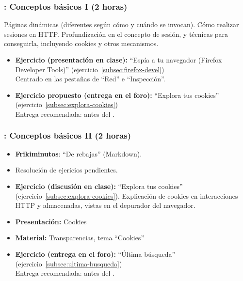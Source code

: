 \documentclass[a4paper,12pt]{article}
\begin{document}
\subsubsection{\lunesA: Conceptos básicos I (2 horas)}
\label{cal:lunesA}

Páginas dinámicas (diferentes según cómo y cuándo se invocan). Cómo realizar sesiones en HTTP. Profundización en el concepto de sesión, y técnicas para conseguirla, incluyendo cookies y otros mecanismos.

\begin{itemize}
\item \textbf{Ejercicio (presentación en clase):} ``Espía a tu navegador (Firefox Developer Tools)'' (ejercicio~\ref{subsec:firefox-devel}) \\
  Centrado en las pestañas de ``Red'' e ``Inspección''.
\item \textbf{Ejercicio propuesto (entrega en el foro):} ``Explora tus cookies'' (ejercicio~\ref{subsec:explora-cookies}) \\
  Entrega recomendada: antes del \lunesB.
\end{itemize}


\subsubsection{\lunesB: Conceptos básicos II (2 horas)}
\label{cal:lunesB}

\begin{itemize}
\item \textbf{Frikiminutos}: ``De rebajas'' (Markdown).
\item Resolución de ejericios pendientes.
\item \textbf{Ejercicio (discusión en clase):}  ``Explora tus cookies'' (ejercicio~\ref{subsec:explora-cookies}).
  Explicación de cookies en interacciones HTTP y almacenadas, vistas en el depurador del navegador.
\item \textbf{Presentación:} Cookies
\item \textbf{Material:} Transparencias, tema ``Cookies''
\item \textbf{Ejercicio (entrega en el foro):} ``Última búsqueda'' (ejercicio~\ref{subsec:ultima-busqueda}) \\
  Entrega recomendada: antes del \lunesC. \\
\end{itemize}
\end{document}
